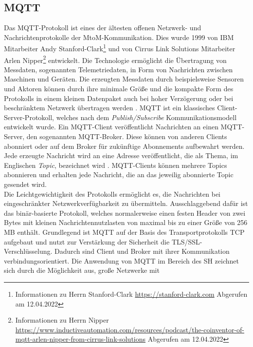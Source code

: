     \subsection{MQTT}
    \label{subsec:mqtt}
        Das \ac{MQTT}-Protokoll ist eines der ältesten offenen Netzwerk- und Nachrichtenprotokolle der 
        \ac{MtoM}-Kommunikation. 
        Dies wurde 1999 von IBM Mitarbeiter Andy Stanford-Clark\footnote{Informationen zu Herrn Stanford-Clark \url{https://stanford-clark.com} Abgerufen am 12.04.2022} 
        und von Cirrus Link Solutions Mitarbeiter Arlen Nipper\footnote{Informationen zu Herrn Nipper \url{https://www.inductiveautomation.com/resources/podcast/the-coinventor-of-mqtt-arlen-nipper-from-cirrus-link-solutions} Abgerufen am 12.04.2022} 
        entwickelt. Die Technologie ermöglicht die Übertragung von Messdaten, sogenannten Telemetriedaten, in Form von 
        Nachrichten zwischen Maschinen und Geräten. Die erzeugten Messdaten durch beispielsweise Sensoren und Aktoren 
        können durch ihre minimale Größe und die kompakte Form des Protokolls in einem kleinen Datenpaket auch bei 
        hoher Verzögerung oder bei beschränktem Netzwerk übertragen werden \cite{Naik2017}. \acs{MQTT} ist ein 
        klassisches Client-Server-Protokoll, welches nach dem \textit{Publish/Subscribe} Kommunikationsmodell 
        entwickelt wurde. Ein \acs{MQTT}-Client veröffentlicht Nachrichten an einen \acs{MQTT}-Server, den sogenannten 
        \acs{MQTT}-Broker. Diese können von anderen Clients abonniert oder auf dem Broker für zukünftige Abonnements 
        aufbewahrt werden. Jede erzeugte Nachricht wird an eine Adresse veröffentlicht, die als Thema, im Englischen \textit{Topic}, 
        bezeichnet wird \cite{Naik2017}. \acs{MQTT}-Clients können mehrere Topics abonnieren und erhalten jede Nachricht, die an 
        das jeweilig abonnierte Topic gesendet wird. 
        \\
        Die Leichtgewichtigkeit des Protokolls ermöglicht es, die Nachrichten bei eingeschränkter Netzwerkverfügbarkeit zu 
        übermitteln. Ausschlaggebend dafür ist das binär-basierte Protokoll, welches normalerweise einen festen Header von 
        zwei Bytes mit kleinen Nachrichtennutzlasten von maximal bis zu einer Größe von 256 MB \cite{Naik2017} enthält. Grundlegend 
        ist \acs{MQTT} auf der Basis des Transportprotokolls \ac{TCP} aufgebaut und nutzt zur Verstärkung der Sicherheit die 
        \ac{TLS}/\ac{SSL}-Verschlüsselung. Dadurch sind Client und Broker mit ihrer Kommunikation verbindungsorientiert. 
        Die Anwendung von \acs{MQTT} im Bereich des \acl{SH} zeichnet sich durch die Möglichkeit aus, große Netzwerke mit 
